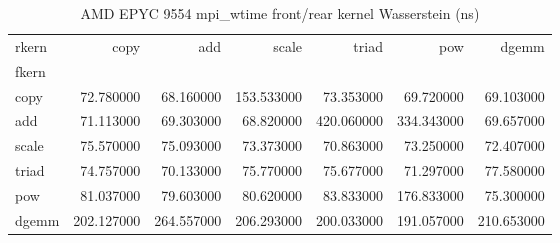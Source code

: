 \begin{table}
\caption{AMD EPYC 9554 mpi_wtime front/rear kernel Wasserstein (ns)}
\begin{tabular}{lrrrrrr}
\toprule
rkern & copy & add & scale & triad & pow & dgemm \\
fkern &  &  &  &  &  &  \\
\midrule
copy & 72.780000 & 68.160000 & 153.533000 & 73.353000 & 69.720000 & 69.103000 \\
add & 71.113000 & 69.303000 & 68.820000 & 420.060000 & 334.343000 & 69.657000 \\
scale & 75.570000 & 75.093000 & 73.373000 & 70.863000 & 73.250000 & 72.407000 \\
triad & 74.757000 & 70.133000 & 75.770000 & 75.677000 & 71.297000 & 77.580000 \\
pow & 81.037000 & 79.603000 & 80.620000 & 83.833000 & 176.833000 & 75.300000 \\
dgemm & 202.127000 & 264.557000 & 206.293000 & 200.033000 & 191.057000 & 210.653000 \\
\bottomrule
\end{tabular}
\end{table}
